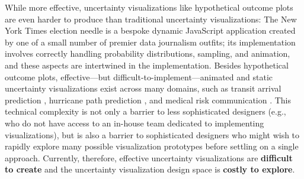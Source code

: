 \documentclass[11pt]{article}
\begin{document}
While more effective, uncertainty visualizations like hypothetical outcome plots are even harder to produce than traditional uncertainty visualizations: The New York Times election needle is a bespoke dynamic JavaScript application created by one of a small number of premier data journalism outfits; its implementation involves correctly handling probability distributions, sampling, and animation, and these aspects are intertwined in the implementation. Besides hypothetical outcome plots, effective---but difficult-to-implement---animated and static uncertainty visualizations exist across many domains, such as transit arrival prediction \cite{kay2016bus, Fernandes2018}, hurricane path prediction \cite{liu2016hurricane, padilla2017effects, Padilla2015, Cox2013hurricane, Mirzargar2014curve_boxplot}, and medical risk communication \cite{Ancker2006}. This technical complexity is not only a barrier to less sophisticated designers (e.g., who do not have access to an in-house team dedicated to implementing visualizations), but is also a barrier to sophisticated designers who might wish to rapidly explore many possible visualization prototypes before settling on a single approach. Currently, therefore, effective uncertainty visualizations are \textbf{difficult to create} and the uncertainty visualization design space is \textbf{costly to explore}.
\end{document}
